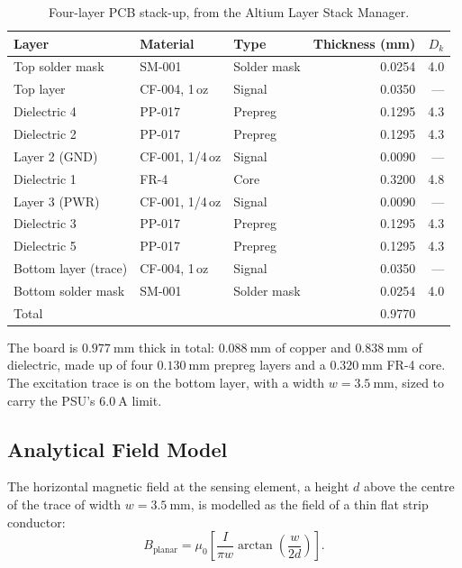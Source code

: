 \documentclass[12pt,a4paper]{article}
\begin{document}
\begin{table}[H]
\centering
\caption{Four-layer PCB stack-up, from the Altium Layer Stack Manager.}
\label{tab:stackup}
\begin{tabular}{@{}lllrr@{}}
\toprule
Layer & Material & Type & Thickness (mm) & $D_k$ \\
\midrule
Top solder mask & SM-001 & Solder mask & 0.0254 & 4.0 \\
Top layer & CF-004, 1\,oz & Signal & 0.0350 & --- \\
Dielectric 4 & PP-017 & Prepreg & 0.1295 & 4.3 \\
Dielectric 2 & PP-017 & Prepreg & 0.1295 & 4.3 \\
Layer 2 (GND) & CF-001, 1/4\,oz & Signal & 0.0090 & --- \\
Dielectric 1 & FR-4 & Core & 0.3200 & 4.8 \\
Layer 3 (PWR) & CF-001, 1/4\,oz & Signal & 0.0090 & --- \\
Dielectric 3 & PP-017 & Prepreg & 0.1295 & 4.3 \\
Dielectric 5 & PP-017 & Prepreg & 0.1295 & 4.3 \\
Bottom layer (trace) & CF-004, 1\,oz & Signal & 0.0350 & --- \\
Bottom solder mask & SM-001 & Solder mask & 0.0254 & 4.0 \\
\midrule
Total & & & 0.9770 & \\
\bottomrule
\end{tabular}
\end{table}
 
The board is $\SI{0.977}{\milli\metre}$ thick in total: $\SI{0.088}{\milli\metre}$ of copper and $\SI{0.838}{\milli\metre}$ of dielectric, made up of four $\SI{0.130}{\milli\metre}$ prepreg layers and a $\SI{0.320}{\milli\metre}$ FR-4 core. The excitation trace is on the bottom layer, with a width $w = \SI{3.5}{\milli\metre}$, sized to carry the PSU's $\SI{6.0}{\ampere}$ limit.

\subsection{Analytical Field Model}
\label{sec:field-model}

The horizontal magnetic field at the sensing element, a height $d$ above the centre of the trace of width $w = \SI{3.5}{\milli\metre}$, is modelled as the field of a thin flat strip conductor:
\begin{equation}
B_{\text{planar}} = \mu_0 \left[ \frac{I}{\pi w} \arctan\left( \frac{w}{2d} \right) \right].
\label{eq:planar}
\end{equation}
\end{document}
